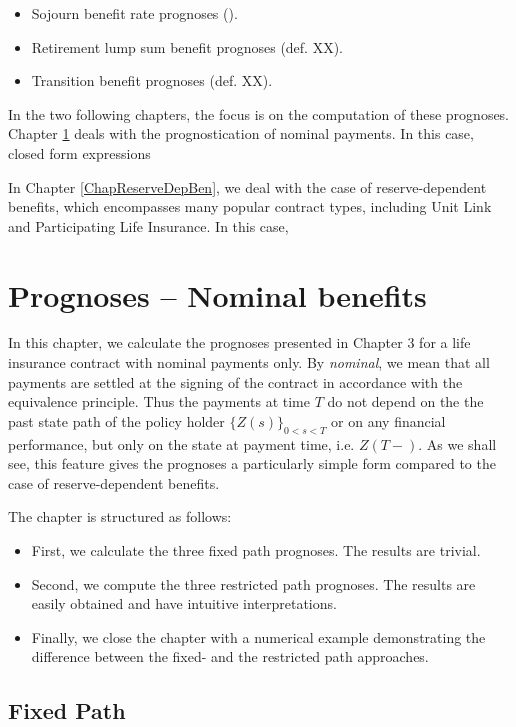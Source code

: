 \documentclass{article}
\newcommand{\1}[1]{\mathbbm{1}_{\left\lbrace #1 \right\rbrace}}
\theoremstyle{break}
\theoremstyle{remark}
\numberwithin{equation}{section}
\begin{document}
\begin{itemize}
	\item Sojourn benefit rate prognoses ().
	\item Retirement lump sum benefit prognoses (def. XX).
	\item Transition benefit prognoses (def. XX).
\end{itemize}

In the two following chapters, the focus is on the computation of these prognoses. Chapter \ref{ChapGuaranteedBen} deals with the prognostication of nominal payments. In this case, closed form expressions

In Chapter \ref{ChapReserveDepBen}, we deal with the case of reserve-dependent benefits, which encompasses many popular contract types, including Unit Link and Participating Life Insurance. In this case, 

\newpage
\section{Prognoses -- Nominal benefits} \label{ChapGuaranteedBen}

In this chapter, we calculate the prognoses presented in Chapter 3 for a life insurance contract with nominal payments only. By \textit{nominal}, we mean that all payments are settled at the signing of the contract in accordance with the equivalence principle. Thus the payments at time $T$ do not depend on the the past state path of the policy holder $\{ Z(s) \}_{0 < s < T}$ or on any financial performance, but only on the state at payment time,  i.e. $Z(T-)$. As we shall see, this feature gives the prognoses a particularly simple form compared to the case of reserve-dependent benefits.

The chapter is structured as follows:

\begin{itemize}
	\item First, we calculate the three fixed path prognoses. The results are trivial.
	\item Second, we compute the three restricted path prognoses. The results are easily obtained and have intuitive interpretations.
	\item Finally, we close the chapter with a numerical example demonstrating the difference between the fixed- and the restricted path approaches.
\end{itemize}

\subsection{Fixed Path}
\end{document}
